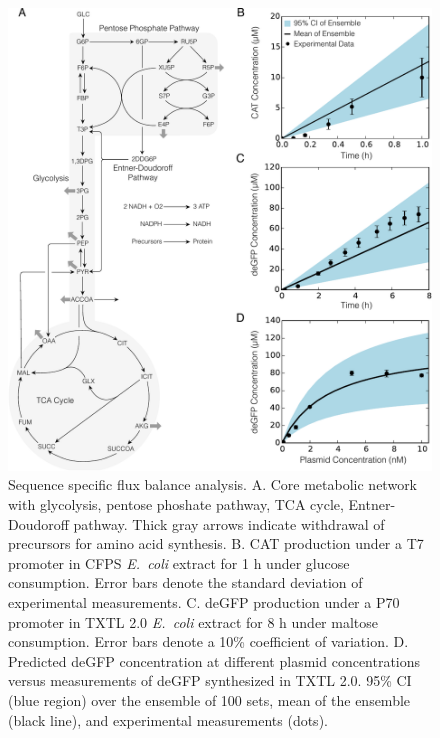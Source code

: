 \documentclass[journal=asbcd6,manuscript=article]{achemso}
\begin{document}
\clearpage

\begin{figure}[t!]
\centering
\includegraphics[width=1.00\textwidth]{./figs/Fig-1-Network-Validation-Simulations.pdf}
\caption{Sequence specific flux balance analysis. A. Core metabolic network with glycolysis, pentose phoshate pathway, TCA cycle, Entner-Doudoroff pathway. Thick gray arrows indicate withdrawal of precursors for amino acid synthesis. B. CAT production under a T7 promoter in CFPS \textit{E.~coli} extract for 1 h under glucose consumption. Error bars denote the standard deviation of experimental measurements. C. deGFP production under a P70 promoter in TXTL 2.0 \textit{E.~coli} extract for 8 h under maltose consumption. Error bars denote a 10\% coefficient of variation. D. Predicted deGFP concentration at different plasmid concentrations versus measurements of deGFP synthesized in TXTL 2.0. 95\% CI (blue region) over the ensemble of 100 sets, mean of the ensemble (black line), and experimental measurements (dots).}
\label{fig:network}
\end{figure}

\clearpage
\end{document}
